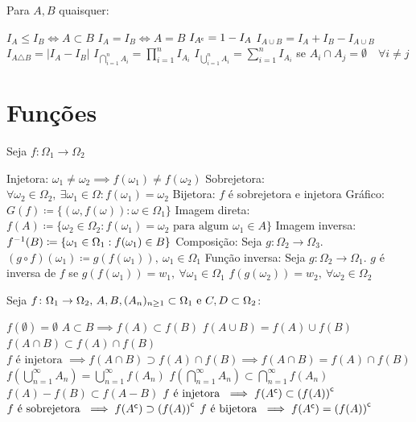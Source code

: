 \begin{theorem} Para $A,B$ quaisquer:
	\begin{outline}[enumerate]
		\1 \(I_A \leq I_B \iff A\subset B\)
		\1 \(I_A = I_B \iff A=B\)
		\1 \(I_{A^\mathsf{c}} = 1 - I_A \)
		\1 \(I_{A\cup B} = I_A + I_B - I_{A\cup B}\)
		\1 \(I_{A\triangle B} = |I_A - I_B|\)
		\1 \(I_{\bigcap_{i=1}^n A_i} = \prod_{i=1}^{n}I_{A_i}\)
		\1 \(I_{\bigcup_{i=1}^n A_i} = \sum_{i=1}^{n}I_{A_i}\) se $A_i\cap A_j =\emptyset \quad \forall i\neq j$
	\end{outline}
\end{theorem}

\section{Funções}

\begin{definition} Seja $f\colon\Omega_1 \to \Omega_2$
	\begin{outline}[]
		\1 Injetora: \(\omega_1\neq\omega_2 \implies f(\omega_1)\neq f(\omega_2) \)
		\1 Sobrejetora: \(\forall \omega_2 \in \Omega_2, \ \exists \omega_1 \in \Omega: f(\omega_1)=\omega_2\)
		\1 Bijetora: $f$ é sobrejetora e injetora
		\1 Gráfico: \(G(f) \coloneq \{(\omega,f(\omega)): \omega \in \Omega_1\}\)
		\1 Imagem direta: \(f(A) \coloneq \{\omega_2\in\Omega_2: f(\omega_1)=\omega_2 \text{ para algum } \omega_1 \in A\}\)
		\1 Imagem inversa: \(f^{-1}(B) \coloneq \{\omega_1\in\Omega_1: f(\omega_1) \in B\}\)
		\1 Composição: Seja $g: \Omega_2 \to \Omega_3$. \((g\circ f) (\omega_1) \coloneq g(f(\omega_1)), \ \omega_1 \in \Omega_1\)
		\1 Função inversa: Seja $g: \Omega_2 \to \Omega_1$. $g$ é inversa de $f$ se 
			\2 \(g(f(\omega_1)) = w_1, \ \forall \omega_1 \in \Omega_1\)
			\2 \(f(g(\omega_2)) = w_2, \ \forall \omega_2 \in \Omega_2\)
 	\end{outline}
\end{definition}

\begin{theorem} Seja \(f\colon\Omega_1 \to \Omega_2$, $A, B, (A_n)_{n\geq1} \subset \Omega_1$ e $C,D  \subset \Omega_2 \):
	\begin{outline}[enumerate]
		\1 \(f(\emptyset) = \emptyset\)
		\1 \(A \subset B \implies f(A) \subset f(B)\)
		\1 \( f(A\cup B) = f(A)\cup f(B) \)
		\1 \( f(A\cap B) \subset f(A)\cap f(B) \)
		\1 \( f \text{ é injetora } \implies f(A\cap B) \supset f(A)\cap f(B) \implies  f(A\cap B) = f(A)\cap f(B) \)
		\1 \(f\left( \bigcup_{n=1}^\infty A_n \right) = \bigcup_{n=1}^\infty f(A_n) \)
		\1 \(f\left( \bigcap_{n=1}^\infty A_n \right) \subset \bigcap_{n=1}^\infty f(A_n) \)
		\1 \(f(A)-f(B) \subset f(A-B)\)
		\1 \( f \text{ é injetora } \implies f(A^\mathsf{c}) \subset \left(f(A)\right)^\mathsf{c} \)
		\1 \( f \text{ é sobrejetora } \implies f(A^\mathsf{c}) \supset \left(f(A)\right)^\mathsf{c} \)
		\1 \( f \text{ é bijetora } \implies f(A^\mathsf{c}) = \left(f(A)\right)^\mathsf{c} \)
	\end{outline}
\end{theorem}

